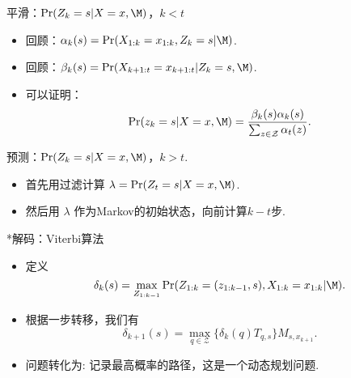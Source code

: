 \begin{frame}{平滑：$\Pr(Z_k = s|X=x, \M)$，$k < t$} 
\begin{itemize}
    \item 回顾：$\alpha_k(s)= \Pr(X_{1:k}=x_{1:k}, Z_k=s| \M)$.
    \item 回顾：$\beta_k(s)=\Pr(X_{k+1:t}=x_{k+1:t} |Z_k=s, \M)$.
    \item 可以证明：
        \[\Pr(z_k = s|X=x, \M)=\frac{\beta_k(s)\alpha_k(s)}{\sum_{z\in\mathcal Z}\alpha_t(z)}.
    \]%
\end{itemize}
\end{frame}


\begin{frame}{预测：$\Pr(Z_k = s|X=x, \M)$，$k > t$.}
\begin{itemize}
    \item 首先用过滤计算 $\lambda=\Pr(Z_t = s|X=x, \M)$.
    \item 然后用 $\lambda$ 作为Markov的初始状态，向前计算$k-t$步.
\end{itemize}
\end{frame}

\begin{frame}{*解码：Viterbi算法}
\begin{itemize}
    \item 定义 
    $$\delta_k(s) = \max_{Z_{1:k-1}}\Pr(Z_{1:k} = (z_{1:k-1}, s), X_{1:k}=x_{1:k}| \M).$$
    \item 根据一步转移，我们有
    $$\delta_{k+1}(s) = \max_{q\in \mathcal Z}\{\delta_k(q)T_{q,s}\}M_{s,x_{k+1}}.$$
    \item 问题转化为: 记录最高概率的路径，这是一个动态规划问题.
\end{itemize}
\end{frame}

